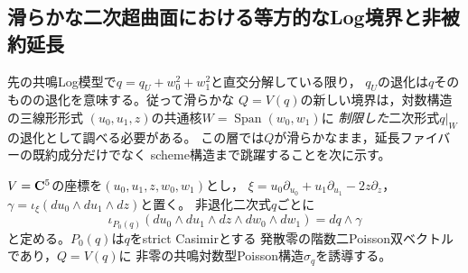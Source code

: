 \subsection{滑らかな二次超曲面における等方的なLog境界と非被約延長}
\label{subsec:quadric-log-isotropic}
先の共鳴Log模型で$q=q_U+w_0^2+w_1^2$と直交分解している限り，
$q_U$の退化は$q$そのものの退化を意味する。従って滑らかな
$Q=V(q)$の新しい境界は，対数構造の三線形形式
$(u_0,u_1,z)$の共通核$W=\operatorname{Span}(w_0,w_1)$に
\emph{制限した}二次形式$q|_W$の退化として調べる必要がある。
この層では$Q$が滑らかなまま，延長ファイバーの既約成分だけでなく
scheme構造まで跳躍することを次に示す。

$V=\mathbf C^5$の座標を$(u_0,u_1,z,w_0,w_1)$とし，
$\xi=u_0\partial_{u_0}+u_1\partial_{u_1}-2z\partial_z$，
$\gamma=\iota_\xi(du_0\wedge du_1\wedge dz)$と置く。
非退化二次式$q$ごとに
\begin{equation}
 \iota_{P_0(q)}(du_0\wedge du_1\wedge dz\wedge dw_0\wedge dw_1)
  =dq\wedge\gamma                                         \label{eq:isotropic-log-p0}
\end{equation}
と定める。$P_0(q)$は$q$をstrict Casimirとする
発散零の階数二Poisson双ベクトルであり，$Q=V(q)$に
非零の共鳴対数型Poisson構造$\sigma_q$を誘導する。

